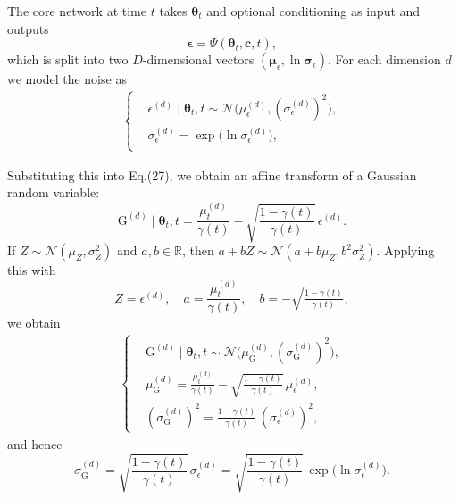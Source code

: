 \documentclass[journal,twoside,web]{ieeecolor}
\begin{document}
The core network at time $t$ takes $\boldsymbol{\theta}_t$ and optional conditioning as input and outputs
\begin{equation}
    \boldsymbol{\epsilon}
    =
    \Psi(\boldsymbol{\theta}_t, \mathbf{c}, t),
\end{equation}
which is split into two $D$-dimensional vectors $(\boldsymbol{\mu}_\epsilon, \ln\boldsymbol{\sigma}_\epsilon)$.
For each dimension $d$ we model the noise as
\begin{equation}
    \begin{aligned}
        \left\{
    \begin{aligned}
        & \epsilon^{(d)} \mid \boldsymbol{\theta}_t, t \sim \mathcal{N}\!\big( \mu_\epsilon^{(d)}, (\sigma_\epsilon^{(d)})^2 \big), \\
        & \sigma_\epsilon^{(d)} = \exp\bigl(\ln\sigma_\epsilon^{(d)}\bigr), \\
    \end{aligned}
    \right.
    \end{aligned}
\end{equation}

Substituting this into Eq.(27), we obtain an affine transform of a Gaussian random variable:
\begin{equation}
    \mathrm{G}^{(d)} \mid \boldsymbol{\theta}_t, t
    =
    \frac{\mu_t^{(d)}}{\gamma(t)}
    -
    \sqrt{\frac{1-\gamma(t)}{\gamma(t)}}\,
    \epsilon^{(d)}.
\end{equation}
If $Z \sim \mathcal{N}(\mu_Z, \sigma_Z^2)$ and $a,b \in \mathbb{R}$, then $a + bZ \sim \mathcal{N}(a + b\mu_Z, b^2\sigma_Z^2)$.  
Applying this with
\[
    Z = \epsilon^{(d)},\quad
    a = \frac{\mu_t^{(d)}}{\gamma(t)},\quad
    b = -\sqrt{\tfrac{1-\gamma(t)}{\gamma(t)}},
\]
we obtain
\begin{equation}
    \begin{aligned}
        \left\{
    \begin{aligned}
        & \mathrm{G}^{(d)} \mid \boldsymbol{\theta}_t, t \sim \mathcal{N}\!\Big( \mu_\mathrm{G}^{(d)}, (\sigma_\mathrm{G}^{(d)})^2 \Big), \\
        & \mu_\mathrm{G}^{(d)} = \frac{\mu_t^{(d)}}{\gamma(t)} - \sqrt{\frac{1-\gamma(t)}{\gamma(t)}}\,\mu_\epsilon^{(d)}, \\
        & (\sigma_\mathrm{G}^{(d)})^2 = \frac{1-\gamma(t)}{\gamma(t)}\, (\sigma_\epsilon^{(d)})^2,
    \end{aligned}
    \right.
    \end{aligned}
\end{equation}
and hence
\begin{equation}
    \sigma_\mathrm{G}^{(d)}
    =
    \sqrt{\frac{1-\gamma(t)}{\gamma(t)}}\,
    \sigma_\epsilon^{(d)}
    =
    \sqrt{\frac{1-\gamma(t)}{\gamma(t)}}\,
    \exp\bigl(\ln\sigma_\epsilon^{(d)}\bigr).
\end{equation}
\end{document}
